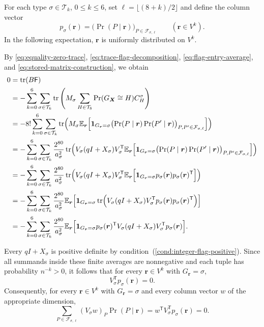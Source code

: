 For each type $\sigma\in\mathcal T_k$, $0\leq k\leq6$, set
$\ell=\lfloor(8+k)/2\rfloor$ and define the column vector
\[
p_\sigma(\boldsymbol r)
=\big(\Pr(P\mid\boldsymbol r)\big)_{P\in\mathcal F_{\sigma,\ell}}
\qquad(\boldsymbol r\in V^k).
\]
In the following expectation, $\boldsymbol r$ is uniformly distributed on $V^k$.
\begin{samepage}
By \eqref{eq:equality-zero-trace}, \eqref{eq:trace-flag-decomposition},
\eqref{eq:flag-entry-average}, and \eqref{eq:stored-matrix-construction},
we obtain
\begin{align}
0&=\operatorname{tr}(B\mathsf F)\notag\\
&=-\sum_{k=0}^6\sum_{\sigma\in\mathcal T_k}
\operatorname{tr}\left(M_\sigma\sum_{H\in\mathcal T_8}
\Pr(G_{\boldsymbol X}\cong H)C_H^\sigma\right)\notag\\
&=-8!\sum_{k=0}^6\sum_{\sigma\in\mathcal T_k}
\operatorname{tr}\Bigl(M_\sigma\mathbb E_{\boldsymbol r}\Bigl[
\mathbf 1_{G_{\boldsymbol r}=\sigma}
\bigl(\Pr(P\mid\boldsymbol r)\Pr(P'\mid\boldsymbol r)\bigr)
_{P,P'\in\mathcal F_{\sigma,\ell}}\Bigr]\Bigr)\notag\\
&=-\sum_{k=0}^6\sum_{\sigma\in\mathcal T_k}
\frac{2^{80}}{a_\sigma^2}
\operatorname{tr}\Bigl(V_\sigma(qI+X_\sigma)V_\sigma^{\mathsf T}
\mathbb E_{\boldsymbol r}\Bigl[\mathbf 1_{G_{\boldsymbol r}=\sigma}
\bigl(\Pr(P\mid\boldsymbol r)\Pr(P'\mid\boldsymbol r)\bigr)
_{P,P'\in\mathcal F_{\sigma,\ell}}\Bigr]\Bigr)\notag\\
&=-\sum_{k=0}^6\sum_{\sigma\in\mathcal T_k}
\frac{2^{80}}{a_\sigma^2}
\operatorname{tr}\Bigl(V_\sigma(qI+X_\sigma)V_\sigma^{\mathsf T}
\mathbb E_{\boldsymbol r}\Bigl[\mathbf 1_{G_{\boldsymbol r}=\sigma}
p_\sigma(\boldsymbol r)p_\sigma(\boldsymbol r)^{\mathsf T}\Bigr]\Bigr)\notag\\
&=-\sum_{k=0}^6\sum_{\sigma\in\mathcal T_k}
\frac{2^{80}}{a_\sigma^2}
\mathbb E_{\boldsymbol r}\Bigl[\mathbf 1_{G_{\boldsymbol r}=\sigma}
\operatorname{tr}\Bigl(V_\sigma(qI+X_\sigma)V_\sigma^{\mathsf T}
p_\sigma(\boldsymbol r)p_\sigma(\boldsymbol r)^{\mathsf T}\Bigr)\Bigr]\notag\\
&=-\sum_{k=0}^6\sum_{\sigma\in\mathcal T_k}
\frac{2^{80}}{a_\sigma^2}
\mathbb E_{\boldsymbol r}\Bigl[\mathbf 1_{G_{\boldsymbol r}=\sigma}
p_\sigma(\boldsymbol r)^{\mathsf T}
V_\sigma(qI+X_\sigma)V_\sigma^{\mathsf T}
p_\sigma(\boldsymbol r)\Bigr].
\label{eq:equality-flag-zero-sum}
\end{align}
\end{samepage}
Every $qI+X_\sigma$ is positive definite by
condition~(\ref{cond:integer-flag-positive}).
Since all summands inside these finite averages are nonnegative and
each tuple has probability $n^{-k}>0$, it follows that for every
$\boldsymbol r\in V^k$ with $G_{\boldsymbol r}=\sigma$,
\begin{equation}\label{eq:equality-root-kernel}
V_\sigma^{\mathsf T}p_\sigma(\boldsymbol r)=0.
\end{equation}
Consequently, for every $\boldsymbol r\in V^k$ with
$G_{\boldsymbol r}=\sigma$ and every column vector $w$ of the appropriate
dimension,
\begin{equation}\label{eq:equality-column-consequence}
\sum_{P\in\mathcal F_{\sigma,\ell}}
(V_\sigma w)_P\Pr(P\mid\boldsymbol r)
=w^{\mathsf T}V_\sigma^{\mathsf T}p_\sigma(\boldsymbol r)=0.
\end{equation}

